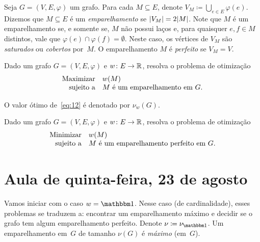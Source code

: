 \documentclass[10pt,reqno]{amsart}
\begin{document}
Seja \(G = (V,E,\varphi)\) um grafo.  Para cada \(M \subseteq E\),
denote \(V_M \coloneqq \bigcup_{e \in E} \varphi(e)\).  Dizemos que
\(M \subseteq E\) é um \emph{emparelhamento} se
\(\lvert V_M\rvert = 2\lvert M\rvert\).  Note que \(M\) é um emparelhamento se, e
somente se, \(M\) não possui laços e, para quaisquer \(e,f \in M\)
distintos, vale que \(\varphi(e) \cap \varphi(f) = \emptyset\).  Neste
caso, os vértices de \(V_M\) são \emph{saturados} ou \emph{cobertos}
por~\(M\).  O emparelhamento \(M\) é \emph{perfeito} se \(V_M = V\).

\begin{problem*}
  Dado um grafo \(G = (V,E,\varphi)\) e \(w \colon E \to \mathbb{R}\),
  resolva o problema de otimização
  \begin{equation}
    \label{eq:12}
    \begin{array}{{rl}}
      \text{Maximizar} & w(M) \\
      \text{sujeito a} & \text{\(M\) é um emparelhamento em \(G\)}.
    \end{array}
  \end{equation}
\end{problem*}

O valor ótimo de~\eqref{eq:12} é denotado por \(\nu_w(G)\).

\begin{problem*}
  Dado um grafo \(G = (V,E,\varphi)\) e \(w \colon E \to \mathbb{R}\),
  resolva o problema de otimização
  \begin{equation}
    \label{eq:13}
    \begin{array}{{rl}}
      \text{Minimizar} & w(M) \\
      \text{sujeito a} & \text{\(M\) é um emparelhamento perfeito em \(G\)}.
    \end{array}
  \end{equation}
\end{problem*}

\section{Aula de quinta-feira, 23 de agosto}

Vamos iniciar com o caso \(w = \ones\).  Nesse caso (de
cardinalidade), esses problemas se traduzem a: encontrar um
emparelhamento máximo e decidir se o grafo tem algum emparelhamento
perfeito.  Denote \(\nu \coloneqq \nu_{\ones}\).  Um emparelhamento
em~\(G\) de tamanho \(\nu(G)\) é \emph{máximo} (em~\(G\)).
\end{document}
